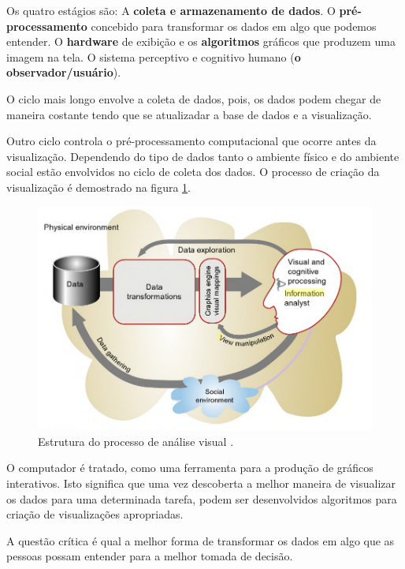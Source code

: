 Os quatro estágios são: A \textbf{coleta e armazenamento de dados}.  
O \textbf{pré-processamento} concebido para transformar os dados em algo que podemos entender. O \textbf{hardware} de exibição e os \textbf{algoritmos} gráficos que produzem uma imagem na tela.
O sistema perceptivo e cognitivo humano (\textbf{o observador/usuário}).

O ciclo mais longo envolve a coleta de dados, pois, os dados podem chegar de maneira costante tendo que se atualizadar a base de dados e a visualização. 

Outro ciclo controla o pré-processamento computacional que ocorre antes da visualização.
Dependendo do tipo de dados tanto o ambiente físico e do ambiente social estão envolvidos no ciclo de coleta dos dados. O processo de criação da visualização é demostrado na figura \ref{fig:processovisual}.

\begin{figure}[htb]
		\begin{center}
			\includegraphics[width=13cm]{images/LevelVisualization.png}
            \caption {Estrutura do processo de análise visual \cite{ware2012information}.}          
            
	\label{fig:processovisual}
		\end{center}
	\end{figure}

O computador é tratado,  como uma ferramenta para a produção de gráficos interativos. Isto significa que uma vez descoberta a melhor maneira de visualizar os dados para uma determinada tarefa, podem ser desenvolvidos algoritmos para criação de visualizações apropriadas.

A questão crítica é qual a melhor forma de transformar os dados em algo que as pessoas possam entender para a melhor tomada de decisão\cite{ware2012information}.

